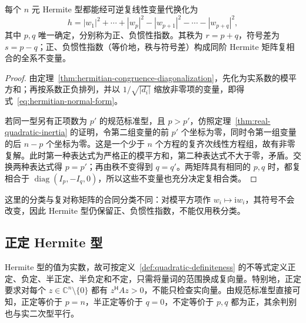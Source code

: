 \begin{theorem}
\label{thm:hermitian-inertia}
每个 $n$ 元 Hermite 型都能经可逆复线性变量代换化为
\begin{equation}
\label{eq:hermitian-normal-form}
    h=|w_1|^2+\cdots+|w_p|^2
       -|w_{p+1}|^2-\cdots-|w_{p+q}|^2,
\end{equation}
其中 $p,q$ 唯一确定，分别称为正、负惯性指数。其秩为 $r=p+q$，符号差为 $s=p-q$；正、负惯性指数（等价地，秩与符号差）构成同阶 Hermite 矩阵复相合的全系不变量。
\end{theorem}
\begin{proof}
由定理~\ref{thm:hermitian-congruence-diagonalization}，先化为实系数的模平方和；再按系数正负排列，并以 $1/\sqrt{|d_i|}$ 缩放非零项的变量，即得式~\eqref{eq:hermitian-normal-form}。

若同一型另有正项数为 $p'$ 的规范标准型，且 $p>p'$，仿照定理~\ref{thm:real-quadratic-inertia} 的证明，令第二组变量的前 $p'$ 个坐标为零，同时令第一组变量的后 $n-p$ 个坐标为零。这是一个少于 $n$ 个方程的复齐次线性方程组，故有非零复解。此时第一种表达式为严格正的模平方和，第二种表达式不大于零，矛盾。交换两种表达式得 $p=p'$；再由秩不变得到 $q=q'$。两矩阵具有相同的 $p,q$ 时，都复相合于 $\operatorname{diag}(I_p,-I_q,0)$，所以这些不变量也充分决定复相合类。
\end{proof}

这里的分类与复对称矩阵的合同分类不同：对模平方项作 $w_i\mapsto\mathrm i w_i$，其符号不会改变，因此 Hermite 型仍保留正、负惯性指数，不能仅用秩分类。

\subsection{正定 Hermite 型}

Hermite 型的值为实数，故可按定义~\ref{def:quadratic-definiteness} 的不等式定义正定、负定、半正定、半负定和不定，只需将量词的范围换成复向量。特别地，正定要求对每个 $z\in\mathbb C^n\setminus\{0\}$ 都有 $z^{\mathsf H}Az>0$，不能只检查实向量。由规范标准型直接可知，正定等价于 $p=n$，半正定等价于 $q=0$，不定等价于 $p,q$ 都为正，其余判别也与实二次型平行。

